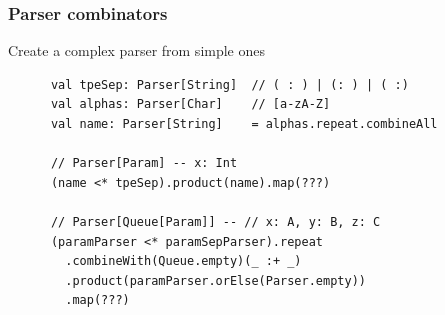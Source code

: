 \begin{frame}[fragile]
  \frametitle{Parser combinators}

  Create a complex parser from simple ones

  \begin{example}
    \begin{lstlisting}
      val tpeSep: Parser[String]  // ( : ) | (: ) | ( :)
      val alphas: Parser[Char]    // [a-zA-Z]
      val name: Parser[String]    = alphas.repeat.combineAll

      // Parser[Param] -- x: Int
      (name <* tpeSep).product(name).map(???)

      // Parser[Queue[Param]] -- // x: A, y: B, z: C
      (paramParser <* paramSepParser).repeat
        .combineWith(Queue.empty)(_ :+ _)
        .product(paramParser.orElse(Parser.empty))
        .map(???)
    \end{lstlisting}
  \end{example}
\end{frame}

